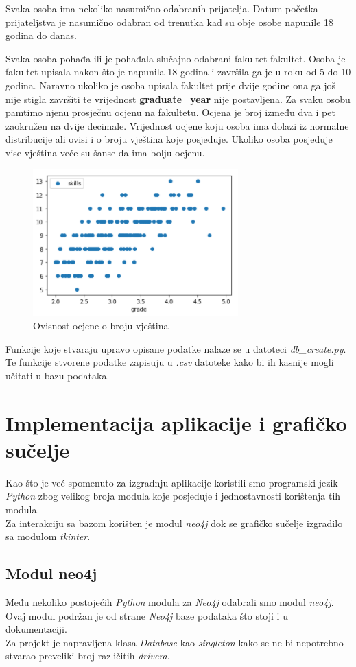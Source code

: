 \documentclass[titlepage, 12pt]{scrartcl}
\begin{document}
Svaka osoba ima nekoliko nasumično odabranih prijatelja. Datum početka prijateljstva je nasumično odabran od trenutka kad su obje osobe napunile 18 godina do danas.

Svaka osoba pohađa ili je pohađala slučajno odabrani fakultet fakultet. Osoba je fakultet upisala nakon što je napunila 18 godina i završila ga je u roku od 5 do 10 godina. Naravno ukoliko je osoba upisala fakultet prije dvije godine ona ga još nije stigla završiti te vrijednost \textbf{graduate\_year} nije postavljena.
Za svaku osobu pamtimo njenu prosječnu ocjenu na fakultetu. Ocjena je broj između dva i pet zaokružen na dvije decimale. Vrijednost ocjene koju osoba ima dolazi iz normalne distribucije ali ovisi i o broju vještina koje posjeduje. Ukoliko osoba posjeduje vise vještina veće su šanse da ima bolju ocjenu.
\begin{figure}
    \centering
    \includegraphics{slike/Grades.png}
    \caption{Ovisnost ocjene o broju vještina}
    \label{fig:hobbies}
\end{figure}

Funkcije koje stvaraju upravo opisane podatke nalaze se u datoteci \emph{db\_create.py}. 
Te funkcije stvorene podatke zapisuju u \emph{.csv} datoteke kako bi ih kasnije mogli učitati u bazu podataka.  
\newpage

\section{Implementacija aplikacije i grafičko sučelje}
Kao što je već spomenuto za izgradnju aplikacije koristili smo programski jezik \emph{Python} zbog velikog broja modula koje posjeduje i jednostavnosti korištenja tih modula. \\
Za interakciju sa bazom korišten je modul \emph{neo4j} dok se grafičko sučelje izgradilo sa modulom \emph{tkinter}.
\subsection{Modul neo4j}
Među nekoliko postojećih \emph{Python} modula za \emph{Neo4j} odabrali smo modul \emph{neo4j}. Ovaj modul podržan je od strane \emph{Neo4j} baze podataka što stoji i u dokumentaciji.\\
Za projekt je napravljena klasa \emph{Database} kao \emph{singleton} kako se ne bi nepotrebno stvarao preveliki broj različitih \emph{drivera}.
\end{document}
